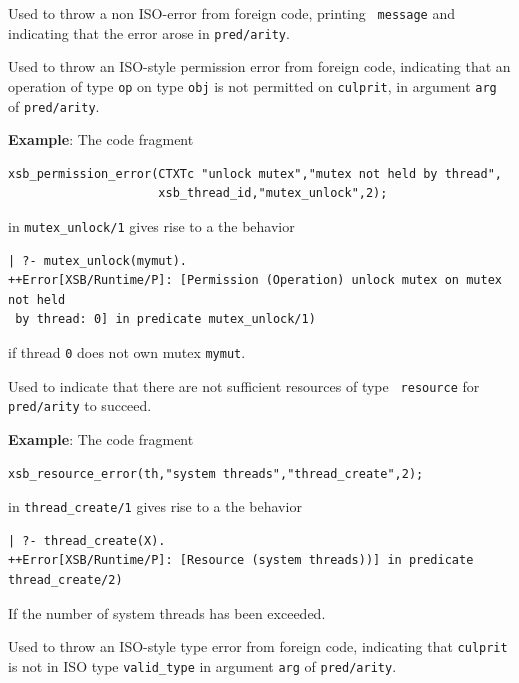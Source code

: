 \begin{description}

%
Used to throw a non ISO-error from foreign code, printing {\tt
  message} and indicating that the error arose in {\tt pred/arity}.


%
Used to throw an ISO-style permission error from foreign code,
indicating that an operation of type {\tt op} on type {\tt obj} is not
permitted on {\tt culprit}, in argument {\tt arg} of {\tt pred/arity}.

{\bf Example}: The code fragment
%
\begin{verbatim}
xsb_permission_error(CTXTc "unlock mutex","mutex not held by thread",
                     xsb_thread_id,"mutex_unlock",2);
\end{verbatim}
in {\tt mutex\_unlock/1} gives rise to a the behavior
\begin{verbatim}
| ?- mutex_unlock(mymut).
++Error[XSB/Runtime/P]: [Permission (Operation) unlock mutex on mutex not held
 by thread: 0] in predicate mutex_unlock/1)
\end{verbatim}
if thread {\tt 0} does not own mutex {\tt mymut}.


%
Used to indicate that there are not sufficient resources of type {\tt
  resource} for {\tt pred/arity} to succeed.

{\bf Example}: The code fragment
%
\begin{verbatim}
xsb_resource_error(th,"system threads","thread_create",2);
\end{verbatim}
in {\tt thread\_create/1} gives rise to a the behavior
\begin{verbatim}
| ?- thread_create(X).
++Error[XSB/Runtime/P]: [Resource (system threads))] in predicate thread_create/2)
\end{verbatim}
If the number of system threads has been exceeded.

%
Used to throw an ISO-style type error from foreign code, indicating
that {\tt culprit} is not in ISO type {\tt valid\_type} in argument
{\tt arg} of {\tt pred/arity}.


\end{description}
